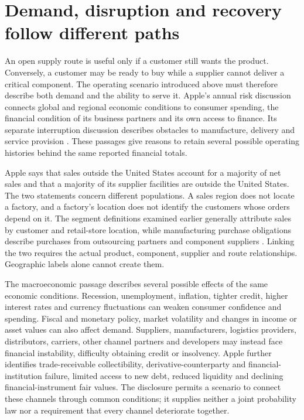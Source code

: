 \section{Demand, disruption and recovery follow different paths}
\label{sec:apple-disruption}

An open supply route is useful only if a customer still wants the product.
Conversely, a customer may be ready to buy while a supplier cannot deliver a
critical component. The operating scenario introduced above must therefore
describe both demand and the ability to serve it. Apple's annual risk discussion
connects global and regional economic conditions to consumer spending, the
financial condition of its business partners and its own access to finance.
Its separate interruption discussion describes obstacles to manufacture,
delivery and service provision \citep[Risk Factors, printed pp.~5--6]{apple2024}.
These passages give reasons to retain several possible operating histories
behind the same reported financial totals.

Apple says that sales outside the United States account for a majority of net
sales and that a majority of its supplier facilities are outside the United
States. The two statements concern different populations. A sales region does
not locate a factory, and a factory's location does not identify the customers
whose orders depend on it. The segment definitions examined earlier generally
attribute sales by customer and retail-store location, while manufacturing
purchase obligations describe purchases from outsourcing partners and component
suppliers \citep[Note 13, printed p.~46; Liquidity and Capital Resources,
printed p.~25]{apple2024}. Linking the two requires the actual product,
component, supplier and route relationships. Geographic labels alone cannot
create them.

The macroeconomic passage describes several possible effects of the same
economic conditions. Recession, unemployment, inflation, tighter credit,
higher interest rates and currency fluctuations can weaken consumer confidence
and spending. Fiscal and monetary policy, market volatility and changes in
income or asset values can also affect demand. Suppliers, manufacturers,
logistics providers, distributors, carriers, other channel partners and
developers may instead face financial instability, difficulty obtaining credit
or insolvency. Apple further identifies trade-receivable collectibility,
derivative-counterparty and financial-institution failure, limited access to
new debt, reduced liquidity and declining financial-instrument fair values.
The disclosure permits a scenario to connect these channels through common
conditions; it supplies neither a joint probability law nor a requirement
that every channel deteriorate together.

